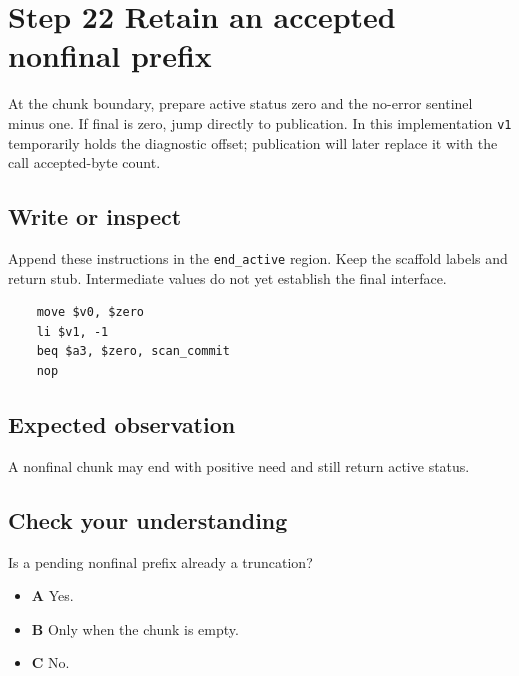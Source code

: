 \section{Step 22 Retain an accepted nonfinal prefix}\label{utf8-s22}

At the chunk boundary, prepare active status zero and the no-error sentinel minus one. If final is zero, jump directly to publication. In this implementation \texttt{v1} temporarily holds the diagnostic offset; publication will later replace it with the call accepted-byte count.

\subsection{Write or inspect}
Append these instructions in the \texttt{end\_active} region. Keep the scaffold labels and return stub. Intermediate values do not yet establish the final interface.

\begin{verbatim}
    move $v0, $zero
    li $v1, -1
    beq $a3, $zero, scan_commit
    nop
\end{verbatim}

\subsection{Expected observation}
A nonfinal chunk may end with positive need and still return active status.

\subsection{Check your understanding}
Is a pending nonfinal prefix already a truncation?

\begin{itemize}
  \item \textbf{A} Yes.
  \item \textbf{B} Only when the chunk is empty.
  \item \textbf{C} No.
\end{itemize}
